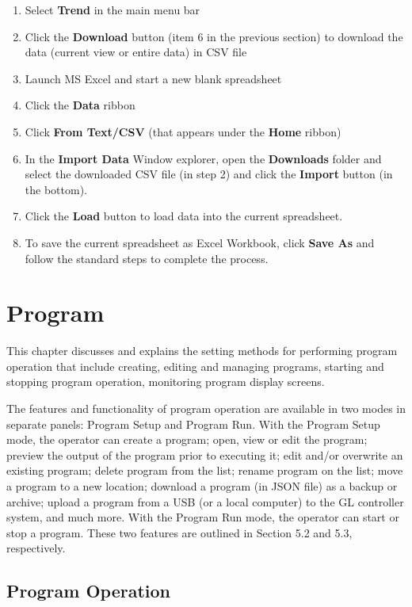 \begin{enumerate}
\def\labelenumi{\arabic{enumi}.}
\item
  Select \textbf{Trend} in the main menu bar
\item
  Click the \textbf{Download} button (item 6 in the previous section) to
  download the data (current view or entire data) in CSV file
\item
  Launch MS Excel and start a new blank spreadsheet
\item
  Click the \textbf{Data} ribbon
\item
  Click \textbf{From Text/CSV} (that appears under the \textbf{Home}
  ribbon)
\item
  In the \textbf{Import Data} Window explorer, open the
  \textbf{Downloads} folder and select the downloaded CSV file (in step
  2) and click the \textbf{Import} button (in the bottom).
\item
  Click the \textbf{Load} button to load data into the current
  spreadsheet.
\item
  To save the current spreadsheet as Excel Workbook, click \textbf{Save
  As} and follow the standard steps to complete the process.
\end{enumerate}


\chapter{Program}

This chapter discusses and explains the setting methods for performing
program operation that include creating, editing and managing programs,
starting and stopping program operation, monitoring program display
screens.

The features and functionality of program operation are available in two
modes in separate panels: Program Setup and Program Run. With the
Program Setup mode, the operator can create a program; open, view or
edit the program; preview the output of the program prior to executing
it; edit and/or overwrite an existing program; delete program from the
list; rename program on the list; move a program to a new location;
download a program (in JSON file) as a backup or archive; upload a
program from a USB (or a local computer) to the GL controller system,
and much more. With the Program Run mode, the operator can start or stop
a program. These two features are outlined in Section 5.2 and 5.3,
respectively.


\section{Program Operation}

